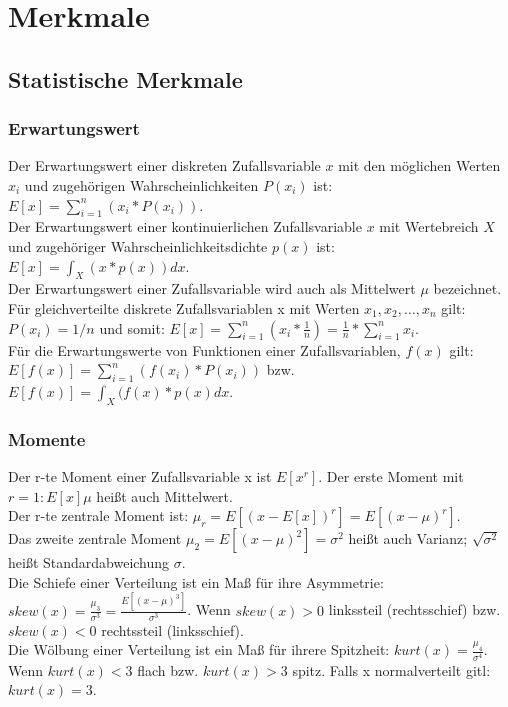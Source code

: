 \documentclass{article} %
\begin{document}
\section{Merkmale}
	\subsection{Statistische Merkmale}
		\subsubsection{Erwartungswert}
		Der Erwartungswert einer diskreten Zufallsvariable $x$ mit den möglichen Werten $x_{i}$ und zugehörigen Wahrscheinlichkeiten $P(x_{i})$ ist: $E[x] = \sum_{i=1}^{n} (x_{i}*P(x_i))$.\\
		Der Erwartungswert einer kontinuierlichen Zufallsvariable $x$ mit Wertebreich $X$ und zugehöriger Wahrscheinlichkeitsdichte $p(x)$ ist: $E[x] = \int_{X} (x*p(x)) dx$.\\
		Der Erwartungswert einer Zufallsvariable wird auch als Mittelwert $\mu$ bezeichnet.\\
		Für gleichverteilte diskrete Zufallsvariablen x mit Werten $x_1,x_2,\dots,x_n$ gilt: $P(x_i) = 1/n$ und somit: $E[x] = \sum_{i=1}^{n} (x_{i}*\frac{1}{n}) = \frac{1}{n}*\sum_{i=1}^{n} x_{i}$.\\
		Für die Erwartungswerte von Funktionen einer Zufallsvariablen, $f(x)$ gilt: $E[f(x)]=\sum_{i=1}^{n} (f(x_i)*P(x_i))$ bzw. $E[f(x)] = \int_{X} (f(x)*p(x) dx$.
		\subsubsection{Momente}
		Der r-te Moment einer Zufallsvariable x ist $E[x^r]$. Der erste Moment mit $r=1: E[x] \mu$ heißt auch Mittelwert.\\
		Der r-te zentrale Moment ist: $\mu_r = E[(x-E[x])^r] = E[(x-\mu)^r]$.\\ 
		Das zweite zentrale Moment $\mu_2 = E[(x-\mu)^2] = \sigma^2$ heißt auch Varianz; $\sqrt{\sigma^2}$ heißt Standardabweichung $\sigma$.\\
		Die Schiefe einer Verteilung ist ein Maß für ihre Asymmetrie: $skew(x) = \frac{\mu_3}{\sigma^3} = \frac{E[(x-\mu)^3]}{\sigma^3}$. Wenn $skew(x) > 0$ linkssteil (rechtsschief) bzw. $skew(x) < 0$ rechtssteil (linksschief).\\
		Die Wölbung einer Verteilung ist ein Maß für ihrere Spitzheit: $kurt(x) = \frac{\mu_4}{\sigma^4}$. Wenn $kurt(x) < 3$ flach bzw. $kurt(x) > 3$ spitz. Falls x normalverteilt gitl: $kurt(x)=3$.
\end{document}

